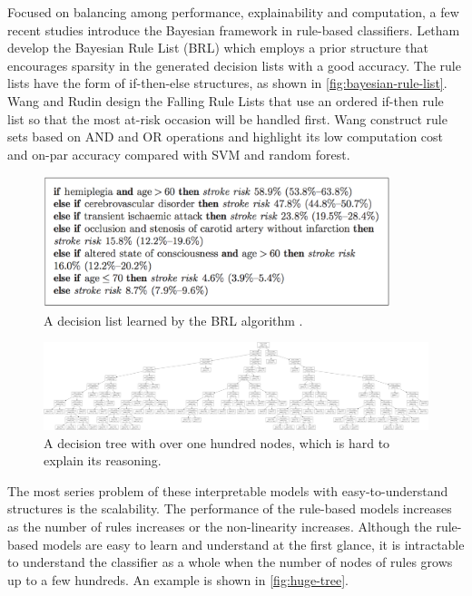 Focused on balancing among performance, explainability and computation, a few recent studies introduce the Bayesian framework in rule-based classifiers. Letham \etal \cite{letham2015stroke} develop the Bayesian Rule List (BRL) which employs a prior structure that encourages sparsity in the generated decision lists with a good accuracy. The rule lists have the form of if-then-else structures, as shown in \autoref{fig:bayesian-rule-list}. Wang and Rudin \cite{wang2015falling} design the Falling Rule Lists that use an ordered if-then rule list so that the most at-risk occasion will be handled first. Wang \etal \cite{wang2017rulesets} construct rule sets based on AND and OR operations and highlight its low computation cost and on-par accuracy compared with SVM and random forest.


\begin{figure}[tb]
  \centering
  \includegraphics[width=0.9\textwidth]{figure/bayesian-rule-list}
  \caption{A decision list learned by the BRL algorithm \cite{letham2015stroke}.}
  \label{fig:bayesian-rule-list}
\end{figure}

\begin{figure}[tb]
  \centering
  \includegraphics[width=1.0\textwidth]{figure/huge-tree}
  \caption{A decision tree with over one hundred nodes, which is hard to explain its reasoning.}
  \label{fig:huge-tree}
\end{figure}

The most series problem of these interpretable models with easy-to-understand structures is the scalability. The performance of the rule-based models increases as the number of rules increases or the non-linearity increases. Although the rule-based models are easy to learn and understand at the first glance, it is intractable to understand the classifier as a whole when the number of nodes of rules grows up to a few hundreds. An example is shown in \autoref{fig:huge-tree}.

